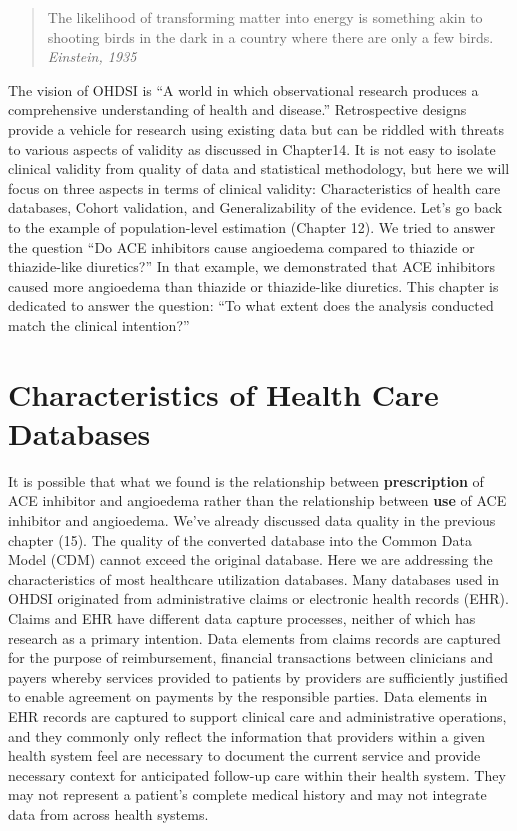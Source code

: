 \documentclass[
  letterpaper,
  paper=7in:10in,
  pagesize=pdftex,
  headinclude=on,
  footinclude=on,
  12pt]{scrbook}
\begin{document}
\begin{quote}
The likelihood of transforming matter into energy is something akin to
shooting birds in the dark in a country where there are only a few
birds. \emph{Einstein, 1935}
\end{quote}

The vision of OHDSI is ``A world in which observational research
produces a comprehensive understanding of health and disease.''
Retrospective designs provide a vehicle for research using existing data
but can be riddled with threats to various aspects of validity as
discussed in Chapter14. It is not easy to isolate clinical validity from
quality of data and statistical methodology, but here we will focus on
three aspects in terms of clinical validity: Characteristics of health
care databases, Cohort validation, and Generalizability of the evidence.
Let's go back to the example of population-level estimation (Chapter
12). We tried to answer the question ``Do ACE inhibitors cause
angioedema compared to thiazide or thiazide-like diuretics?'' In that
example, we demonstrated that ACE inhibitors caused more angioedema than
thiazide or thiazide-like diuretics. This chapter is dedicated to answer
the question: ``To what extent does the analysis conducted match the
clinical intention?''

\section{Characteristics of Health Care
Databases}\label{characteristics-of-health-care-databases}

It is possible that what we found is the relationship between
\textbf{prescription} of ACE inhibitor and angioedema rather than the
relationship between \textbf{use} of ACE inhibitor and angioedema. We've
already discussed data quality in the previous chapter (15). The quality
of the converted database into the Common Data Model (CDM) cannot exceed
the original database. Here we are addressing the characteristics of
most healthcare utilization databases. Many databases used in OHDSI
originated from administrative claims or electronic health records
(EHR). Claims and EHR have different data capture processes, neither of
which has research as a primary intention. Data elements from claims
records are captured for the purpose of reimbursement, financial
transactions between clinicians and payers whereby services provided to
patients by providers are sufficiently justified to enable agreement on
payments by the responsible parties. Data elements in EHR records are
captured to support clinical care and administrative operations, and
they commonly only reflect the information that providers within a given
health system feel are necessary to document the current service and
provide necessary context for anticipated follow-up care within their
health system. They may not represent a patient's complete medical
history and may not integrate data from across health systems.
\end{document}
